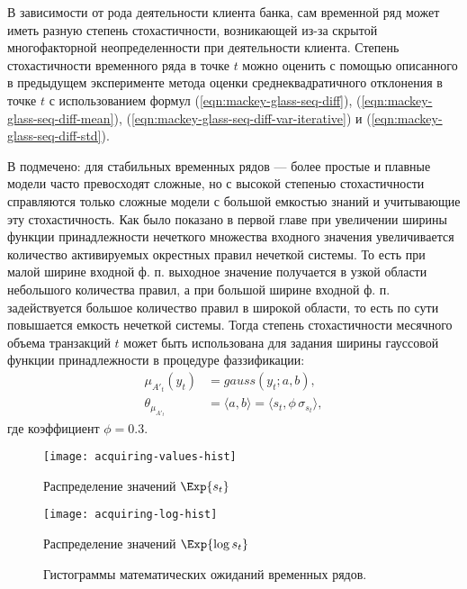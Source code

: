 
В зависимости от рода деятельности клиента банка, сам временной ряд может иметь разную степень стохастичности, возникающей из-за скрытой многофакторной неопределенности при деятельности клиента. Степень стохастичности временного ряда в точке $t$ можно оценить с помощью описанного в предыдущем эксперименте метода оценки среднеквадратичного отклонения в точке $t$ с использованием формул (\ref{eqn:mackey-glass-seq-diff}),  (\ref{eqn:mackey-glass-seq-diff-mean}), (\ref{eqn:mackey-glass-seq-diff-var-iterative}) и (\ref{eqn:mackey-glass-seq-diff-std}).

В \cite{Green2015} подмечено: для стабильных временных рядов --- более простые и плавные модели часто превосходят сложные, но с высокой степенью стохастичности справляются только сложные модели с большой емкостью знаний и учитывающие эту стохастичность. Как было показано в первой главе при увеличении ширины функции принадлежности нечеткого множества входного значения увеличивается количество активируемых окрестных правил нечеткой системы. То есть при малой ширине входной ф. п. выходное значение получается в узкой области небольшого количества правил, а при большой ширине входной ф. п. задействуется большое количество правил в широкой области, то есть по сути повышается емкость нечеткой системы. Тогда степень стохастичности месячного объема транзакций $t$ может быть использована для задания ширины гауссовой функции принадлежности в процедуре фаззификации:
\begin{equation*}
	\begin{aligned}
			\mu_{A'_t}(y_t) &= gauss(y_t; a, b), \\
			\theta_{\mu_{A'_t}} &= \langle a, b \rangle = \langle s_t, \phi\,\sigma_{s_t}\rangle,
		\end{aligned}
\end{equation*}
где коэффициент $\phi = 0.3$.

\begin{figure}[ht]
	\centering
	\begin{minipage}[b]{0.48\textwidth}
		\centering
		\texttt{[image: acquiring-values-hist]}
		\caption*{Распределение значений $\Exp{s_t}$}
	\end{minipage}
	\hfill
	\begin{minipage}[b]{0.48\textwidth}
		\centering
		\texttt{[image: acquiring-log-hist]}
		\caption*{Распределение значений $\Exp{\log{s_t}}$}
	\end{minipage}
	\caption{Гистограммы математических ожиданий временных рядов.}
	\label{fig:acquiring-values-hists}
\end{figure}

